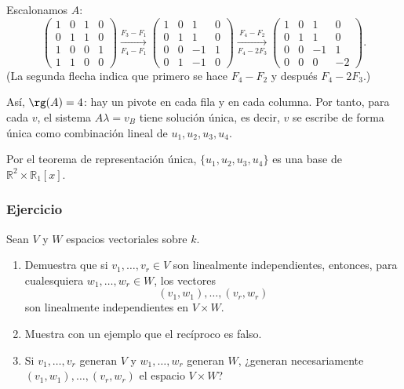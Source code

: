 \begin{frame}[allowframebreaks]
\begin{solution}
        Escalonamos $A$:
        \[
            \begin{pmatrix}
                1&0&1&0\\
                0&1&1&0\\
                1&0&0&1\\
                1&1&0&0
            \end{pmatrix}
            \xrightarrow[F_4-F_1]{F_3-F_1}
            \begin{pmatrix}
                1&0&1&0\\
                0&1&1&0\\
                0&0&-1&1\\
                0&1&-1&0
            \end{pmatrix}
            \xrightarrow[F_4-2F_3]{F_4-F_2}
            \begin{pmatrix}
                1&0&1&0\\
                0&1&1&0\\
                0&0&-1&1\\
                0&0&0&-2
            \end{pmatrix}.
        \]
        (La segunda flecha indica que primero se hace $F_4-F_2$ y después
        $F_4-2F_3$.)

        Así, $\rg(A)=4$: hay un pivote en cada fila y en cada columna.
        Por tanto, para cada $v$, el sistema $A\lambda=v_B$ tiene
        \alert{solución única}, es decir, $v$ se escribe de forma única
        como combinación lineal de $u_1,u_2,u_3,u_4$.

        Por el teorema de representación única, $\{u_1,u_2,u_3,u_4\}$
        es una base de $\mathbb{R}^2\times\mathbb{R}_1[x]$.
    \end{solution}
\end{frame}


\begin{frame}
    \frametitle{Ejercicio}

    \begin{exercise}
        Sean $V$ y $W$ espacios vectoriales sobre $k$.
        \begin{enumerate}
            \item Demuestra que si $v_1,\ldots,v_r\in V$ son linealmente
                  independientes, entonces, para cualesquiera
                  $w_1,\ldots,w_r\in W$, los vectores
                  \[
                      (v_1,w_1),\ldots,(v_r,w_r)
                  \]
                  son linealmente independientes en $V\times W$.
            \item Muestra con un ejemplo que el recíproco es falso.
            \item Si $v_1,\ldots,v_r$ generan $V$ y $w_1,\ldots,w_r$
                  generan $W$, ¿generan necesariamente
                  $(v_1,w_1),\ldots,(v_r,w_r)$ el espacio $V\times W$?
        \end{enumerate}
    \end{exercise}
\end{frame}


